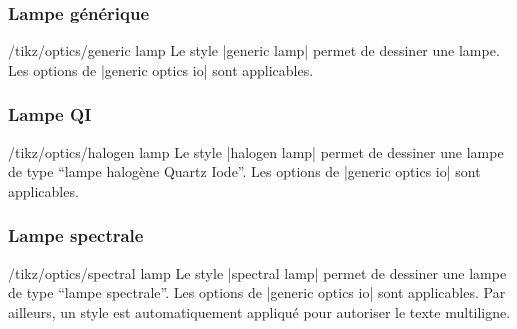 \documentclass[a4paper]{ltxdoc}
\begin{document}
\subsubsection{Lampe générique}

\begin{stylekey}{/tikz/optics/generic lamp}
Le style |generic lamp| permet de dessiner une lampe. Les options de |generic optics io| sont applicables.

\begin{codeexample}[width=6cm]
\end{codeexample}
\end{stylekey}

\subsubsection{Lampe QI}

\begin{stylekey}{/tikz/optics/halogen lamp}
Le style |halogen lamp| permet de dessiner une lampe de type \enquote{lampe halogène Quartz Iode}. Les options de |generic optics io| sont applicables.

\begin{codeexample}[width=6cm]
\end{codeexample}
\end{stylekey}

\subsubsection{Lampe spectrale}

\begin{stylekey}{/tikz/optics/spectral lamp}
Le style |spectral lamp| permet de dessiner une lampe de type \enquote{lampe spectrale}. Les options de |generic optics io| sont applicables. Par ailleurs, un style est automatiquement appliqué pour autoriser le texte multiligne.

\begin{codeexample}[width=6cm]
\end{codeexample}
\end{stylekey}
\end{document}
